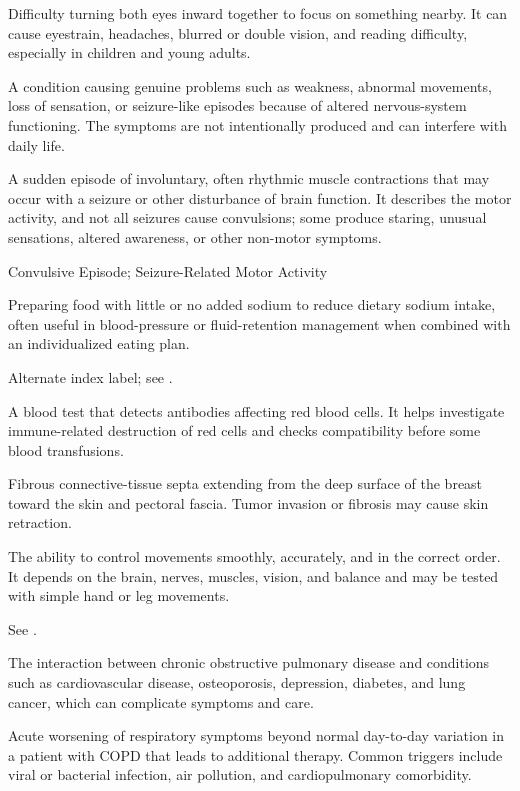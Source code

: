  Difficulty turning both eyes inward together to focus on something nearby. It can cause eyestrain, headaches, blurred or double vision, and reading difficulty, especially in children and young adults.

 A condition causing genuine problems such as weakness, abnormal movements, loss of sensation, or seizure-like episodes because of altered nervous-system functioning. The symptoms are not intentionally produced and can interfere with daily life.

 A sudden episode of involuntary, often rhythmic muscle contractions that may occur with a seizure or other disturbance of brain function. It describes the motor activity, and not all seizures cause convulsions; some produce staring, unusual sensations, altered awareness, or other non-motor symptoms.

\synonyms
Convulsive Episode; Seizure-Related Motor Activity

 Preparing food with little or no added sodium to reduce dietary sodium intake, often useful in blood-pressure or fluid-retention management when combined with an individualized eating plan.

 Alternate index label; see .

 A blood test that detects antibodies affecting red blood cells. It helps investigate immune-related destruction of red cells and checks compatibility before some blood transfusions.

 Fibrous connective-tissue septa extending from the deep surface of the breast toward the
skin and pectoral fascia. Tumor invasion or fibrosis may cause skin retraction.

 The ability to control movements smoothly, accurately, and in the correct order. It depends on the brain, nerves, muscles, vision, and balance and may be tested with simple hand or leg movements.

 See .

 The interaction between chronic obstructive pulmonary disease and conditions such as cardiovascular disease, osteoporosis, depression, diabetes, and lung cancer, which can complicate symptoms and care.

 Acute worsening of respiratory symptoms beyond normal day-to-day variation in a patient
with COPD that leads to additional therapy. Common triggers include viral or bacterial
infection, air pollution, and cardiopulmonary comorbidity.

